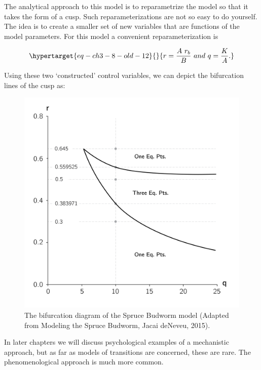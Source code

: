 \documentclass[
  a4paper,
  DIV=11,
  numbers=noendperiod]{scrreprt}
\begin{document}
The analytical approach to this model is to reparametrize the model so
that it takes the form of a cusp. Such reparameterizations are not so
easy to do yourself. The idea is to create a smaller set of new
variables that are functions of the model parameters. For this model a
convenient reparameterization is

\begin{equation}\protect\hypertarget{eq-ch3-8-old-12}{}{
r = \frac{A\ r_{b}}{B}\ and\ q = \frac{K}{A}.
}\label{eq-ch3-8-old-12}\end{equation}

Using these two `constructed' control variables, we can depict the
bifurcation lines of the cusp as:

\begin{figure}

{\centering \includegraphics{media/ch3/ch3-16__figure28.png}

}

\caption{\label{fig-ch3-img16-old-28}The bifurcation diagram of the
Spruce Budworm model (Adapted from Modeling the Spruce Budworm, Jacai
deNeveu, 2015).}

\end{figure}

In later chapters we will discuss psychological examples of a
mechanistic approach, but as far as models of transitions are concerned,
these are rare. The phenomenological approach is much more common.
\end{document}
